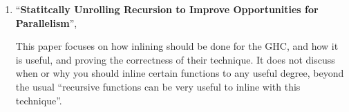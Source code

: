 \begin{enumerate}
	\item ``\textbf{Statitcally Unrolling Recursion to Improve Opportunities for Parallelism}'',

This paper focuses on how inlining should be done for the GHC, and how it is
useful, and proving the correctness of their technique. It does not discuss when
or why you should inline certain functions to any useful degree, beyond the
usual ``recursive functions can be very useful to inline with this technique''.

\end{enumerate}
